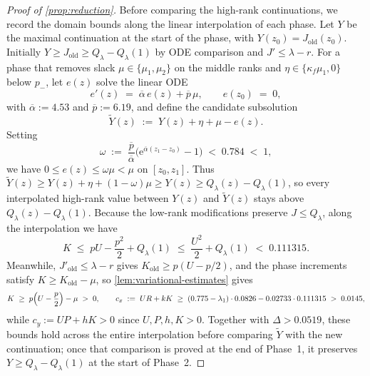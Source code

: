 \documentclass[11pt]{article}
\numberwithin{equation}{section}
\theoremstyle{plain}
\theoremstyle{definition}
\newcommand{\1}{\mathbf{1}}
\begin{document}
\begin{proof}[Proof of {\cref{prop:reduction}}]
Before comparing the high-rank continuations, we record the domain bounds along the linear interpolation of each phase. Let $Y$ be the maximal continuation at the start of the phase, with $Y(z_0) = J_{\mathrm{old}}(z_0)$. Initially $Y \ge J_{\mathrm{old}} \ge Q_\lambda - Q_\lambda(1)$ by ODE comparison and $J' \le \lambda - r$. For a phase that removes slack $\mu \in \{\mu_1, \mu_2\}$ on the middle ranks and $\eta \in \{\kappa_f\mu_1, 0\}$ below $p_-$, let $e(z)$ solve the linear ODE
\[
  e'(z) \;=\; \overline{\alpha}\,e(z) + \overline{p}\,\mu, \qquad e(z_0) \;=\; 0,
\]
with $\overline{\alpha} := 4.53$ and $\overline{p} := 6.19$, and define the candidate subsolution
\[
  \widetilde{Y}(z) \;:=\; Y(z) + \eta + \mu - e(z).
\]
Setting
\[
  \omega \;:=\; \frac{\overline{p}}{\overline{\alpha}}\bigl(\mathrm{e}^{\overline{\alpha}(z_1 - z_0)} - 1\bigr) \;<\; 0.784 \;<\; 1,
\]
we have $0 \le e(z) \le \omega\mu < \mu$ on $[z_0, z_1]$. Thus $\widetilde{Y}(z) \ge Y(z) + \eta + (1 - \omega)\mu \ge Y(z) \ge Q_\lambda(z) - Q_\lambda(1)$, so every interpolated high-rank value between $Y(z)$ and $\widetilde{Y}(z)$ stays above $Q_\lambda(z) - Q_\lambda(1)$. Because the low-rank modifications preserve $J \le Q_\lambda$, along the interpolation we have
\[
  K \;\le\; p U - \frac{p^2}{2} + Q_\lambda(1) \;\le\; \frac{U^2}{2} + Q_\lambda(1) \;<\; 0.111315.
\]
Meanwhile, $J'_{\mathrm{old}} \le \lambda - r$ gives $K_{\mathrm{old}} \ge p(U - p/2)$, and the phase increments satisfy $K \ge K_{\mathrm{old}} - \mu$, so \cref{lem:variational-estimates} gives
\[
  K \;\ge\; p\Bigl(U - \frac{p}{2}\Bigr) - \mu \;>\; 0,
  \qquad
  c_x \;:=\; U R + k K \;\ge\; (0.775 - \lambda_1)\cdot 0.0826 - 0.02733 \cdot 0.111315 \;>\; 0.0145,
\]
while $c_y := U P + h K > 0$ since $U, P, h, K > 0$. Together with $\Delta > 0.0519$, these bounds hold across the entire interpolation before comparing $\widetilde{Y}$ with the new continuation; once that comparison is proved at the end of Phase~1, it preserves $Y \ge Q_\lambda - Q_\lambda(1)$ at the start of Phase~2.


\end{proof}
\end{document}
